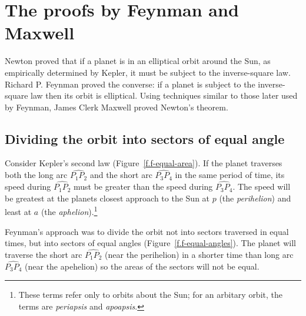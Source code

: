 
\chapter{The proofs by Feynman and Maxwell}\label{s.feynman}

Newton proved that if a planet is in an elliptical orbit around the Sun, as empirically determined by Kepler, it must be subject to the inverse-square law. Richard P. Feynman proved the converse: if a planet is subject to the inverse-square law then its orbit is elliptical. Using techniques similar to those later used by Feynman, James Clerk Maxwell proved Newton's theorem.

\section{Dividing the orbit into sectors of equal angle}

Consider Kepler's second law (Figure~\ref{f.f-equal-area}). If the planet traverses both the long arc $\widehat{P_1P_2}$ and the short arc $\widehat{P_3P_4}$ in the same period of time, its speed during $\widehat{P_1P_2}$ must be greater than the speed during $\widehat{P_3P_4}$. The speed will be greatest at the planets closest approach to the Sun at $p$ (the \emph{perihelion}) and least at $a$ (the \emph{aphelion}).\footnote{These terms refer only to orbits about the Sun; for an arbitary orbit, the terms are \emph{periapsis} and \emph{apoapsis}.}

Feynman's approach was to divide the orbit not into sectors traversed in equal times, but into sectors of equal angles (Figure~\ref{f.f-equal-angles}). The planet will traverse the short arc $\widehat{P_1P_2}$ (near the perihelion) in a shorter time than long arc $\widehat{P_3P_4}$ (near the apehelion) so the areas of the sectors will not be equal.


